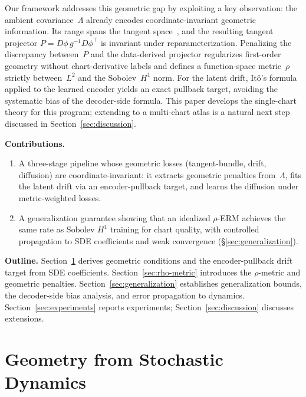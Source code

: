\documentclass[11pt]{article}
\begin{document}
Our framework addresses this geometric gap by
exploiting a key observation: the ambient
covariance~$\Lambda$ already encodes coordinate-invariant
geometric information.
Its range spans the tangent
space~\cite{coifman2006diffusion}, and the resulting tangent
projector $P=D\phi\,g^{-1}D\phi^\top$ is invariant under
reparameterization.
Penalizing the discrepancy between~$P$ and the data-derived
projector regularizes first-order geometry without
chart-derivative labels and defines a function-space
metric~$\rho$ strictly between~$L^2$ and the
Sobolev~$H^1$ norm.
For the latent drift, It\^o's formula applied to the learned
encoder yields an exact pullback target, avoiding the
systematic bias of the decoder-side formula.
This paper develops the single-chart theory for this
program; extending to a multi-chart atlas is a natural
next step discussed in Section~\ref{sec:discussion}.

\noindent \textbf{Contributions.}
\begin{enumerate}
\item A three-stage pipeline whose geometric losses
  (tangent-bundle, drift, diffusion) are coordinate-invariant:
  it extracts geometric penalties from~$\Lambda$, fits the
  latent drift via an encoder-pullback target, and
  learns the diffusion under metric-weighted losses.
\item A generalization guarantee showing that an idealized
  $\rho$-ERM achieves the same rate as Sobolev $H^1$
  training for chart quality, with controlled propagation
  to SDE coefficients and weak convergence
  (\S\ref{sec:generalization}).

\end{enumerate}

\noindent \textbf{Outline.}
Section~\ref{sec:geometry} derives geometric conditions and the
encoder-pullback drift target from SDE coefficients.
Section~\ref{sec:rho-metric} introduces the $\rho$-metric and
geometric penalties.
Section~\ref{sec:generalization} establishes generalization bounds,
the decoder-side bias analysis, and error propagation to dynamics.
Section~\ref{sec:experiments} reports experiments;
Section~\ref{sec:discussion} discusses extensions.


\section{Geometry from Stochastic Dynamics}\label{sec:geometry}
\end{document}
